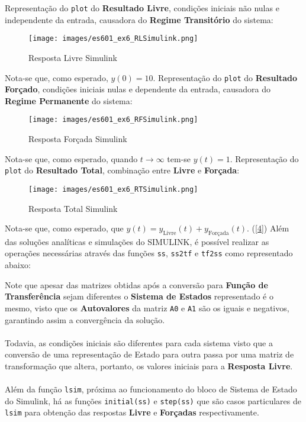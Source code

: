 \documentclass{article}
\begin{document}
\begin{resolution}
\newpage
    Representação do \texttt{plot} do \textbf{Resultado Livre}, condições iniciais não nulas e independente da entrada, causadora do \textbf{Regime Transitório} do sistema:
    \begin{figure}[H]
        \centering
        \texttt{[image: images/es601\_ex6\_RLSimulink.png]}
        \caption{Resposta Livre Simulink}
    \end{figure}
    Nota-se que, como esperado, $y(0) = 10$. Representação do \texttt{plot} do \textbf{Resultado Forçado}, condições iniciais nulas e dependente da entrada, causadora do \textbf{Regime Permanente} do sistema:
    \begin{figure}[H]
        \centering
        \texttt{[image: images/es601\_ex6\_RFSimulink.png]}
        \caption{Resposta Forçada Simulink}
    \end{figure}
    Nota-se que, como esperado, quando $t\to\infty$ tem-se $y(t) = 1$. Representação do \texttt{plot} do \textbf{Resultado Total}, combinação entre \textbf{Livre} e \textbf{Forçada}:
    \begin{figure}[H]
        \centering
        \texttt{[image: images/es601\_ex6\_RTSimulink.png]}
        \caption{Resposta Total Simulink}
    \end{figure}
    Nota-se que, como esperado, que $y(t) = y_\text{Livre}(t) + y_\text{Forçada}(t)$.
\newpage
    (\ref{4}) Além das soluções analíticas e simulações do SIMULINK, é possível realizar as operações necessárias através das funções \texttt{ss}, \texttt{ss2tf} e \texttt{tf2ss} como representado abaixo:
    \begin{scriptsize}
        \myOctave
    \end{scriptsize}
    Note que apesar das matrizes obtidas após a conversão para \textbf{Função de Transferência} sejam diferentes o \textbf{Sistema de Estados} representado é o mesmo, visto que os \textbf{Autovalores} da matriz \texttt{A0} e \texttt{A1} são os iguais e negativos, garantindo assim a convergência da solução.\\\\
    Todavia, as condições iniciais são diferentes para cada sistema visto que a conversão de uma representação de Estado para outra passa por uma matriz de transformação que altera, portanto, os valores iniciais para a \textbf{Resposta Livre}.\\\\
    Além da função \texttt{lsim}, próxima ao funcionamento do bloco de Sistema de Estado do Simulink, há as funções \texttt{initial(ss)} e \texttt{step(ss)} que são casos particulares de \texttt{lsim} para obtenção das respostas \textbf{Livre} e \textbf{Forçadas} respectivamente.

\end{resolution}
\end{document}
